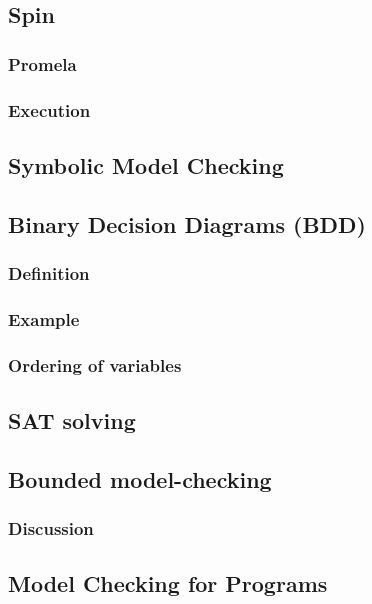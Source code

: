 \documentclass[12pt, a4paper]{book}
\begin{document}
  \subsection{Spin}
  \label{sub:Spin}
  \subsubsection{Promela}
  \label{subs:Promela}
  \subsubsection{Execution}
  \label{subs:Execution}
  \subsection{Symbolic Model Checking}
  \label{sub:Symbolic Model Checking}
  \subsection{Binary Decision Diagrams (BDD)}
  \label{sub:Binary Decision Diagrams (BDD)}
  \subsubsection{Definition}
  \label{subs:Definition}
  \subsubsection{Example}
  \label{subs:Example}
  \subsubsection{Ordering of variables}
  \label{subs:Ordering of variables}
  \subsection{SAT solving}
  \label{sub:SAT solving}
  \subsection{Bounded model-checking}
  \label{sub:Bounded model-checking}
  \subsubsection{Discussion}
  \label{subs:Discussion}
  \subsection{Model Checking for Programs}
  \label{sub:Model Checking for Programs}
\end{document}
